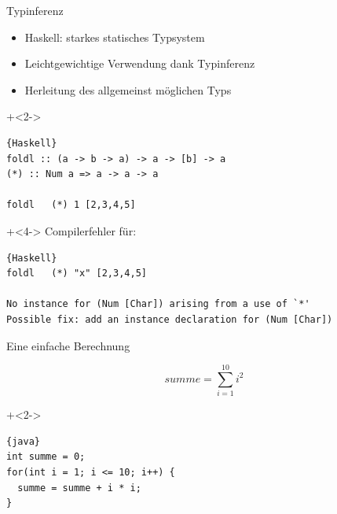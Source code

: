 \begin{frame}[fragile]{Typinferenz}
\begin{itemize}
\item Haskell: starkes statisches Typsystem
\item Leichtgewichtige Verwendung dank Typinferenz
\item Herleitung des allgemeinst möglichen Typs
\end{itemize}

\onslide+<2->
\begin{lstlisting}{Haskell}
foldl :: (a -> b -> a) -> a -> [b] -> a
(*) :: Num a => a -> a -> a

foldl	(*) 1 [2,3,4,5]
\end{lstlisting}

\vfill


\onslide+<4->
Compilerfehler für:
\begin{lstlisting}{Haskell}
foldl	(*) "x" [2,3,4,5]

No instance for (Num [Char]) arising from a use of `*'
Possible fix: add an instance declaration for (Num [Char])
\end{lstlisting}

\end{frame}


\begin{frame}[fragile]{Eine einfache Berechnung}

\[
summe = \sum_{i=1}^{10}i^2
\]

\vspace{5em}

\onslide+<2->
\begin{lstlisting}{java}
int summe = 0;
for(int i = 1; i <= 10; i++) {
  summe = summe + i * i;
}
\end{lstlisting}
\end{frame}

